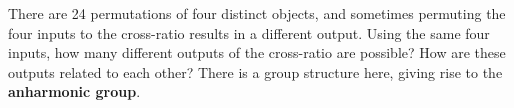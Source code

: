 \documentclass{homework}
\begin{document}
                                                                                                          \begin{problem}
                                                                                                            There are 24 permutations of four distinct objects, and sometimes
                                                                                                              permuting the four inputs to the cross-ratio results in a different
                                                                                                                output.  Using the same four inputs, how many different outputs of
                                                                                                                  the cross-ratio are possible?  How are these outputs related to each
                                                                                                                    other?  There is a group structure here, giving rise to the
                                                                                                                      \textbf{anharmonic group}.
                                                                                                                      \end{problem}
\end{document}
